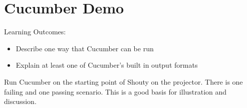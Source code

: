 \chapter*{Cucumber Demo}

\ifnotes

    Learning Outcomes:
    
    \begin{itemize}
        \item Describe one way that Cucumber can be run
        \item Explain at least one of Cucumber's built in output formats
    \end{itemize}

    Run Cucumber on the starting point of Shouty on the projector. There is one failing and one passing scenario. This is a good basis for illustration and discussion.
    

\fi 

\ifcontent

    
    
\fi